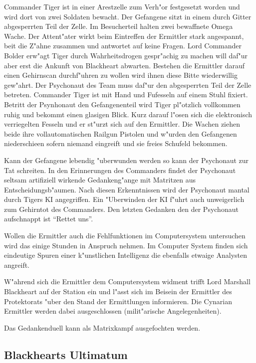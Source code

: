 Commander Tiger ist in einer Arestzelle zum Verh"or festgesetzt worden und wird dort von zwei Soldaten bewacht. Der Gefangene sitzt in einem durch Gitter abgesperrten Teil der Zelle. Im Besucherteil halten zwei bewaffnete Omega Wache. Der Attent"ater wirkt beim Eintreffen der Ermittler stark angespannt, bei\3t die Z"ahne zusammen und antwortet auf keine Fragen. Lord Commander Bolder erw"agt Tiger durch Wahrheitsdrogen gespr"achig zu machen will daf"ur aber erst die Ankunft von Blackheart abwarten. Bestehen die Ermittler darauf einen Gehirnscan durchf"uhren zu wollen wird ihnen diese Bitte wiederwillig gew"ahrt. Der Psychonaut des Team muss daf"ur den abgesperrten Teil der Zelle betreten. Commander Tiger ist mit Hand und Fu\3fesseln auf einem Stuhl fixiert. Betritt der Psynhonaut den Gefangenenteil wird Tiger pl"otzlich vollkommen ruhig und bekommt einen glasigen Blick. Kurz darauf l"osen sich die elektronisch verriegelten Fesseln und er st"urzt sich auf den Ermittler. Die Wachen ziehen beide ihre vollautomatischen Railgun Pistolen und w"urden den Gefangenen niederschie\3en sofern niemand eingreift und sie freies Schu\3feld bekommen.

Kann der Gefangene lebendig "uberwunden werden so kann der Psychonaut zur Tat schreiten. In den Erinnerungen des Commanders findet der Psychonaut seltsam artifiziell wirkende Gedankeng"ange mit Matritzen aus Entscheidungsb"aumen. Nach diesen Erkenntnissen wird der Psychonaut mantal durch Tigers KI angegriffen. Ein "Uberwinden der KI f"uhrt auch unweigerlich zum Gehirntot des Commanders. Den letzten Gedanken den der Psychonaut aufschnappt ist ``Rettet uns''.

Wollen die Ermittler auch die Fehlfunktionen im Computersystem untersuchen wird das einige Stunden in Anspruch nehmen. Im Computer System finden sich eindeutige Spuren einer k"unstlichen Intelligenz die ebenfalls etwaige Analysten angreift.

W"ahrend sich die Ermittler dem Computersystem widment trifft Lord Marshall Blackheart auf der Station ein und l"asst sich im Beisein der Ermittler des Protektorats "uber den Stand der Ermittlungen informieren. Die Cynarian Ermittler werden dabei ausgeschlossen (milit"arische Angelegenheiten).

\begin{remarks}
Das Gedankenduell kann als Matrixkampf ausgefochten werden.
\end{remarks}

\subsection{Blackhearts Ultimatum}

